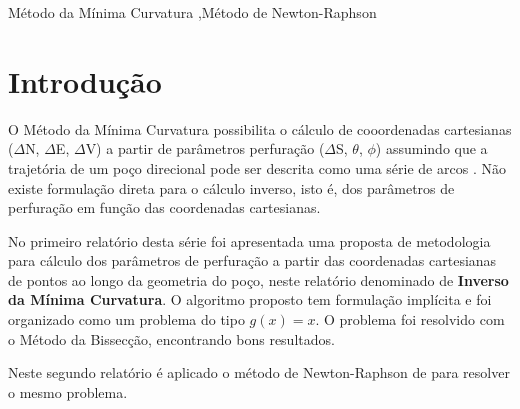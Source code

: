 \documentclass[final,5p]{elsarticle}
\numberwithin{equation}{section}
\begin{document}
\begin{frontmatter}
\begin{abstract}
\end{abstract}




\begin{keyword}
    Método da Mínima Curvatura \sep Método de Newton-Raphson



\end{keyword}

\end{frontmatter}


\section{Introdução}

O Método da Mínima Curvatura possibilita o cálculo de cooordenadas cartesianas ($\Delta$N, $\Delta$E, $\Delta$V) a partir de parâmetros perfuração ($\Delta$S, $\theta$, $\phi$) assumindo que a trajetória de um poço direcional pode ser descrita como uma série de arcos \cite{10.2118/84246-MS}. Não existe formulação direta para o cálculo inverso, isto é, dos parâmetros de perfuração em função das coordenadas cartesianas.

No primeiro relatório desta série \cite{relatoriobisseccao} foi apresentada uma proposta de metodologia para cálculo dos parâmetros de perfuração a partir das coordenadas cartesianas de pontos ao longo da geometria do poço, neste relatório denominado de \textbf{Inverso da Mínima Curvatura}. O algoritmo proposto tem formulação implícita e foi organizado como um problema do tipo $g(x)=x$. O problema foi resolvido com o Método da Bissecção, encontrando bons resultados.

Neste segundo relatório é aplicado o método de Newton-Raphson de para resolver o mesmo problema.
\end{document}
